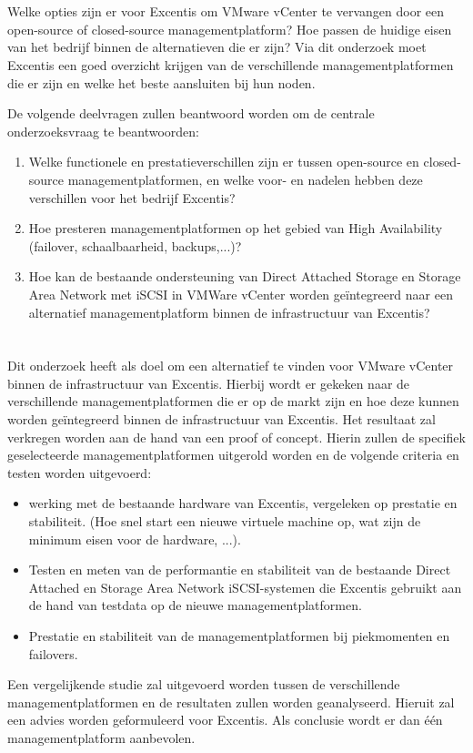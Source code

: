 \section{}%
\label{sec:onderzoeksvraag}

Welke opties zijn er voor Excentis om VMware vCenter te vervangen door een open-source of closed-source managementplatform? Hoe passen de huidige eisen van het bedrijf binnen de alternatieven die er zijn?
Via dit onderzoek moet Excentis een goed overzicht krijgen van de verschillende managementplatformen die er zijn en welke het beste aansluiten bij hun noden.

De volgende deelvragen zullen beantwoord worden om de centrale onderzoeksvraag te beantwoorden:
\begin{enumerate}
  \item Welke functionele en prestatieverschillen zijn er tussen open-source en closed-source managementplatformen, en welke voor- en nadelen hebben deze verschillen voor het bedrijf Excentis?
  \item Hoe presteren managementplatformen op het gebied van High Availability (failover, schaalbaarheid, backups,...)?
  \item Hoe kan de bestaande ondersteuning van Direct Attached Storage en Storage Area Network met iSCSI in VMWare vCenter worden geïntegreerd naar een alternatief managementplatform binnen de infrastructuur van Excentis?
  \end{enumerate}
\newpage
\section{}%
\label{sec:onderzoeksdoelstelling}
Dit onderzoek heeft als doel om een alternatief te vinden voor VMware vCenter binnen de infrastructuur van Excentis. Hierbij wordt er gekeken naar de verschillende managementplatformen die er op de markt zijn en hoe deze kunnen worden geïntegreerd binnen de infrastructuur van Excentis.
Het resultaat zal verkregen worden aan de hand van een proof of concept. Hierin zullen de specifiek geselecteerde managementplatformen uitgerold worden en de volgende criteria en testen worden uitgevoerd:
\begin{itemize}
  \item werking met de bestaande hardware van Excentis, vergeleken op prestatie en stabiliteit. (Hoe snel start een nieuwe virtuele machine op, wat zijn de minimum eisen voor de hardware, ...).
  \item Testen en meten van de performantie en stabiliteit van de bestaande Direct Attached en Storage Area Network iSCSI-systemen die Excentis gebruikt aan de hand van testdata op de nieuwe managementplatformen.
  \item Prestatie en stabiliteit van de managementplatformen bij piekmomenten en failovers.
\end{itemize}
Een vergelijkende studie zal uitgevoerd worden tussen de verschillende managementplatformen en de resultaten zullen worden geanalyseerd. Hieruit zal een advies worden geformuleerd voor Excentis.
Als conclusie wordt er dan één managementplatform aanbevolen.


